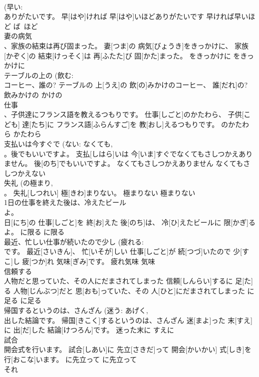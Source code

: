 \documentclass[8pt]{extreport}
\begin{document}
\begin{CJK}{UTF8}{min}
\\	(早い: 
\\	ありがたいです。	早[はや]ければ 早[はや]いほどありがたいです	早ければ早いほど	ば~ほど	
\\	妻の病気 
\\	、家族の結束は再び固まった。	妻[つま]の 病気[びょうき]をきっかけに、 家族[かぞく]の 結束[けっそく]は 再[ふたた]び 固[かた]まった。	をきっかけに	をきっかけに	
\\	テーブルの上の (飲む: 
\\	コーヒー、誰の?	テーブルの 上[うえ]の 飲[の]みかけのコーヒー、 誰[だれ]の?	飲みかけの	かけの~	
\\	仕事 
\\	、子供達にフランス語を教えるつもりです。	仕事[しごと]のかたわら、 子供[こども] 達[たち]に フランス語[ふらんすご]を 教[おし]えるつもりです。	のかたわら	かたわら	
\\	支払いは今すぐで (ない: なくても, 
\\	。後でもいいですよ。	支払[しはら]いは 今[いま]すぐでなくてもさしつかえありません。 後[のち]でもいいですよ。	なくてもさしつかえありません	なくてもさしつかえない	
\\	失礼 (の極まり, 
\\	。	失礼[しつれい] 極[きわ]まりない。	極まりない	極まりない	
\\	1日の仕事を終えた後は、冷えたビール 
\\	よ。	
\\	日[にち]の 仕事[しごと]を 終[お]えた 後[のち]は、 冷[ひ]えたビールに 限[かぎ]るよ。	に限る	に限る	
\\	最近、忙しい仕事が続いたので少し (疲れる: 
\\	です。	最近[さいきん]、 忙[いそが]しい 仕事[しごと]が 続[つづ]いたので 少[すこ]し 疲[つか]れ 気味[ぎみ]です。	疲れ気味	気味	
\\	信頼する 
\\	人物だと思っていた、その人にだまされてしまった	信頼[しんらい]するに 足[た]る 人物[じんぶつ]だと 思[おも]っていた、その 人[ひと]にだまされてしまった	に足る	に足る	
\\	帰国するというのは、さんざん (迷う: あげく, 
\\	出した結論です。	帰国[きこく]するというのは、さんざん 迷[まよ]った 末[すえ]に 出[だ]した 結論[けつろん]です。	迷った末に	すえに	
\\	試合 
\\	開会式を行います。	試合[しあい]に 先立[さきだ]って 開会[かいかい] 式[しき]を 行[おこな]います。	に先立って	に先立って	
\\	それ 

\end{CJK}
\end{document}
